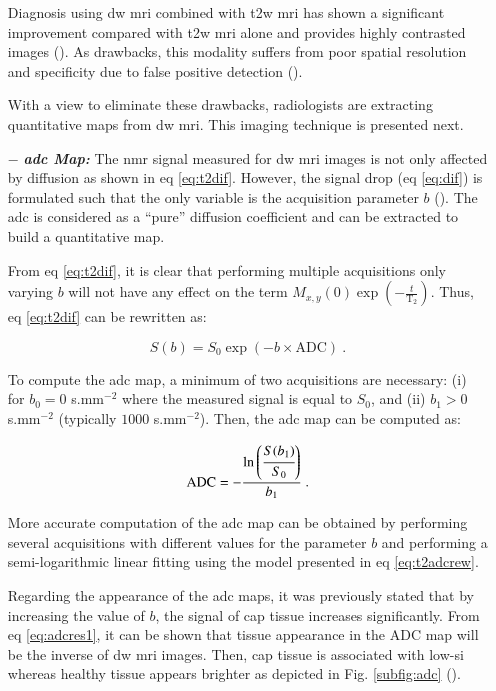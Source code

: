 \begin{enumerate}[leftmargin=*]
Diagnosis using \ac{dw} \ac{mri} combined with \ac{t2w} \ac{mri} has shown a significant improvement compared with \ac{t2w} \ac{mri} alone and provides highly contrasted images (\cite{Shimofusa2005,Padhani2011,Choi2007}). As drawbacks, this modality suffers from poor spatial resolution and specificity due to false positive detection (\cite{Choi2007}).

With a view to eliminate these drawbacks, radiologists are extracting quantitative maps from \ac{dw} \ac{mri}. This imaging technique is presented next.

\item[$-$] \textbf{\textit{\ac{adc} Map:}} The \ac{nmr} signal measured for \ac{dw} \ac{mri} images is not only affected by diffusion as shown in \acs{eq} \eqref{eq:t2dif}. However, the signal drop (\acs{eq} \eqref{eq:dif}) is formulated such that the only variable is the acquisition parameter $b$ (\cite{LeBihan1986}). The \ac{adc} is considered as a ``pure'' diffusion coefficient and can be extracted to build a quantitative map.

From \acs{eq} \eqref{eq:t2dif}, it is clear that performing multiple acquisitions only varying $b$ will not have any effect on the term  $M_{x,y}(0) \exp \left( - \frac{t}{\text{T}_2} \right)$. Thus, \acs{eq} \eqref{eq:t2dif} can be rewritten as:

\begin{equation}
	S(b) = S_0 \exp \left( -b \times \text{ADC} \right) \ .
	\label{eq:t2adcrew}
\end{equation}

To compute the \ac{adc} map, a minimum of two acquisitions are necessary: (i) for $b_0=0$ s.mm$^{-2}$ where the measured signal is equal to $S_0$, and (ii) $b_1>0$ s.mm$^{-2}$ (typically $1000$ s.mm$^{-2}$). Then, the \ac{adc} map can be computed as:

\begin{equation}
	\text{ADC} = - \frac{\ln \left( \cfrac{S(b_1)}{S_0} \right) }{b_1} \ .
	\label{eq:adcres1}
\end{equation}

More accurate computation of the \ac{adc} map can be obtained by performing several acquisitions with different values for the parameter $b$ and performing a semi-logarithmic linear fitting using the model presented in \acs{eq} \eqref{eq:t2adcrew}.

Regarding the appearance of the \ac{adc} maps, it was previously stated that by increasing the value of $b$, the signal of \ac{cap} tissue increases significantly. From \acs{eq} \eqref{eq:adcres1}, it can be shown that tissue appearance in the ADC map will be the inverse of \ac{dw} \ac{mri} images. Then, \ac{cap} tissue is associated with low-\ac{si} whereas healthy tissue appears brighter as depicted in Fig. \ref{subfig:adc} (\cite{Barentsz2012}).


\end{enumerate}
